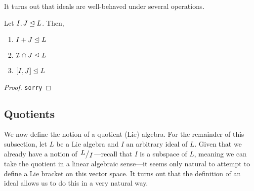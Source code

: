 It turns out that ideals are well-behaved under several operations.

\begin{boxproposition}
    Let $I, J \trianglelefteq L$. Then,
    \begin{enumerate}[label = \normalfont\arabic*., noitemsep]
        \item $I + J \trianglelefteq L$
        \item $\mathcal{I} \cap J \trianglelefteq L$
        \item $\left[ I, J \right] \trianglelefteq L$
    \end{enumerate}
\end{boxproposition}
\begin{proof}
    \verb|sorry|
\end{proof}

\subsection{Quotients}

We now define the notion of a quotient (Lie) algebra. For the remainder of this subsection, let $L$ be a Lie algebra and $I$ an arbitrary ideal of $L$. Given that we already have a notion of $\quotient{L}{I}$---recall that $I$ is a subspace of $L$, meaning we can take the quotient in a linear algebraic sense---it seems only natural to attempt to define a Lie bracket on this vector space. It turns out that the definition of an ideal allows us to do this in a very natural way.

